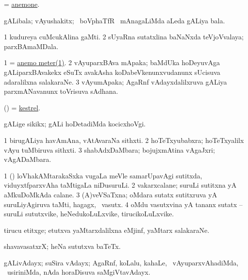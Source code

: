 \bentry
{}
\gl{\nA}
\bmng
= \hyperref{kandict_a.pdf}{A}{anemone}{anemone}. 
\emng
\eentry

\bentry
{} 
\gl{\nA}
\expl{}
\bmng
gALibala; vAyushakitx; \kanmu\ boVphaTfR \mo\ mAnagaLiMda aLeda gALiya bala. 
\emng
\eentry

\bentry
{}
\gl{\nA}
\bmng
\bnum
\num{1} kudureya cuMcukAlina gaMti. 
\num{2} sUyaRna sutatxlina baNaNxda teVjoVvalaya; parxBAmaMDala. 
\enum
\emng
\eentry

\bentry
{}
\gl{\nA}
\bmng
\bnum
\num{1} = \hyperref{kandict_a.pdf}{A}{anemo meter(1)}{anemo meter(1)}. 
\num{2} vAyuparxBAva mApaka; baMdUka hoDeyuvAga gALiparxBAvakekx eSuTx avakAsha koDabeVkenunxvudanunx sUcisuva adaralilxna salakaraNe. 
\num{3} vAyumApaka; AgaRnf vAdayxdalilxruva gALiya parxmANavanunx toVrisuva sAdhana. 
\enum
\emng
\eentry

\bentry
{}
\gl{\nA}
\bmng
(\birx) = \hyperref{kandict_k.pdf}{K}{kestrel}{kestrel}. 
\emng
\eentry

\bentry
{}
\gl{\kirxvi}
\bmng
gALige sikikx; gALi hoDetadiMda kocicxhoVgi. 
\emng
\eentry

\bentry
{}
\gl{\nA}
\bmng
\bnum
\num{1} birugALiya havAmAna, vAtAvaraNa sithxti. 
\num{2} hoTeTxyubabxra; hoTeTxyalilx vAyu tuMbiruva sithxti. 
\num{3} shabAdxDaMbara; bojujxmAtina vAgaJxri; vAgADaMbara. 
\enum
\emng
\eentry

\bentry
{}
\gl{\nA}
\bmng
\bnum
\num{1} (\viduyx) \eng{[} loVhakAMtarakaSxka  \mo vugaLa meVle samarUpavAgi sutitxda, viduyxtfparxvAha taMtigaLa\eng{]} niDusuruLi. 
\num{2} vakarxcalane; suruLi sutitxna yA aMkuDoMkAda calane. 
\num{3} (A)veVSaTxna; oMdara sutatx sutitxruva yA suruLiyAgiruva taMti, hagagx, \mo\ vasutx. 
\num{4} oMdu vasutxvina yA tananx sutatx -- suruLi sututxvike, heNedukoLuLxvike, tirucikoLuLxvike. 
\enum
\emng
\eentry

\bentry
{}
\gl{\nA}
\bmng
tirucu etitxge; etutxva yaMtarxdalilxna eMjinf, yaMtarx salakaraNe. 
\emng
\eentry

\bentry
{}
\gl{\nA}
\bmng
shavavasatxrX; heNa sututxva baTeTx. 
\emng
\eentry

\bentry
{}
\gl{\nA}
\bmng
gALivAdayx; suSira vAdayx; AgaRnf, koLalu, kahaLe, \mo\ vAyuparxvAhadiMda, \kanmu\ usiriniMda, nAda horaDisuva saMgiVtavAdayx. 
\emng
\eentry

